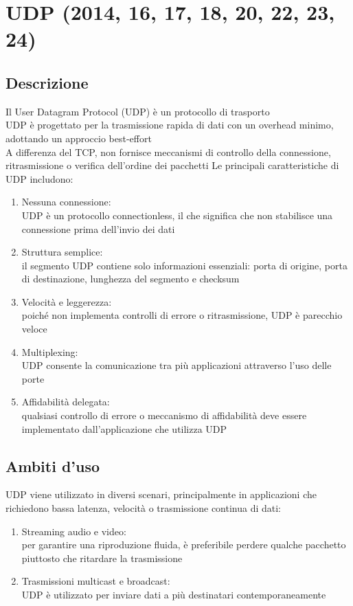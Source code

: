 \documentclass[10pt,oneside,a4paper]{article}
\begin{document}
\section{UDP (2014, 16, 17, 18, 20, 22, 23, 24)}
\subsection{Descrizione}
Il User Datagram Protocol (UDP) è un protocollo di trasporto\\
UDP è progettato per la trasmissione rapida di dati con un overhead minimo, adottando un approccio best-effort\\
A differenza del TCP, non fornisce meccanismi di controllo della connessione, ritrasmissione o verifica dell'ordine dei pacchetti
Le principali caratteristiche di UDP includono:
\begin{enumerate}
\item Nessuna connessione:\\
UDP è un protocollo connectionless, il che significa che non stabilisce una connessione prima dell'invio dei dati
\item Struttura semplice:\\
il segmento UDP contiene solo informazioni essenziali: porta di origine, porta di destinazione, lunghezza del segmento e checksum
\item Velocità e leggerezza:\\
poiché non implementa controlli di errore o ritrasmissione, UDP è parecchio veloce
\item Multiplexing:\\
UDP consente la comunicazione tra più applicazioni attraverso l'uso delle porte
\item Affidabilità delegata:\\
qualsiasi controllo di errore o meccanismo di affidabilità deve essere implementato dall'applicazione che utilizza UDP
\end{enumerate}
\subsection{Ambiti d'uso}
UDP viene utilizzato in diversi scenari, principalmente in applicazioni che richiedono bassa latenza, velocità o trasmissione continua di dati:
\begin{enumerate}
\item Streaming audio e video:\\
per garantire una riproduzione fluida, è preferibile perdere qualche pacchetto piuttosto che ritardare la trasmissione
\item Trasmissioni multicast e broadcast:\\
UDP è utilizzato per inviare dati a più destinatari contemporaneamente
\end{enumerate}
\end{document}
